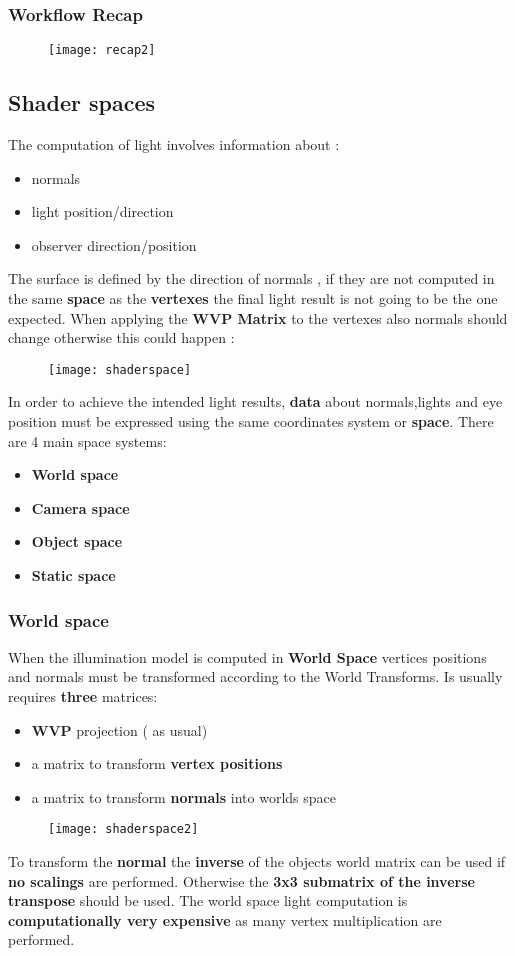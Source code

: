 \subsubsection{Workflow Recap}
\begin{figure}[H]
 \centering
 \texttt{[image: recap2]} 
\end{figure} 

\subsection{Shader spaces}
The computation of light involves information about :
\begin{itemize}
\item normals
\item light position/direction
\item observer direction/position
\end{itemize}
The surface is defined by the direction of normals , if they are not computed in the same \textbf{space} as the \textbf{vertexes} the final light result is not going to be the one expected. When applying the \textbf{WVP Matrix} to the vertexes also normals should change otherwise this could happen :
\begin{figure}[H]
 \centering
 \texttt{[image: shaderspace]} 
\end{figure} 
In order to achieve the intended light results, \textbf{data} about normals,lights and eye position must be expressed using the same coordinates system or \textbf{space}.
There are 4 main space systems:
\begin{itemize}
\item \textbf{World space}
\item \textbf{Camera space}
\item \textbf{Object space}
\item \textbf{Static space}
\end{itemize}

\subsubsection{World space}
When the illumination model is computed in \textbf{World Space} vertices positions and normals must be transformed according to the World Transforms. Is usually requires \textbf{three} matrices: 
\begin{itemize}
\item \textbf{WVP} projection ( as usual)
\item a matrix to transform \textbf{vertex positions}
\item a matrix to transform \textbf{normals} into worlds space
\end{itemize}
\begin{figure}[H]
 \centering
 \texttt{[image: shaderspace2]} 
\end{figure} 
To transform the \textbf{normal}  the \textbf{inverse} of the objects world matrix can be used if \textbf{no scalings}  are performed. Otherwise the \textbf{3x3 submatrix of the inverse transpose} should be used.
The world space light computation is\textbf{ computationally very expensive} as many vertex multiplication are performed.

